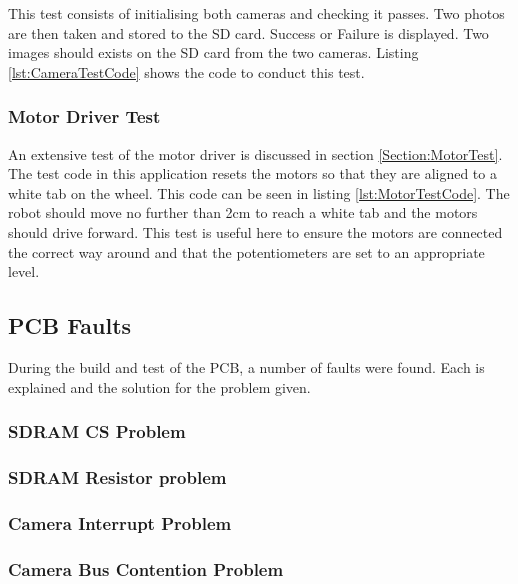 This test consists of initialising both cameras and checking it passes. Two photos are then taken and stored to the SD card. Success or Failure is displayed. Two images should exists on the SD card from the two cameras. Listing \ref{lst:CameraTestCode} shows the code to conduct this test.


\subsubsection{Motor Driver Test}
An extensive test of the motor driver is discussed in section \ref{Section:MotorTest}. The test code in this application resets the motors so that they are aligned to a white tab on the wheel. This code can be seen in listing \ref{lst:MotorTestCode}. The robot should move no further than 2cm to reach a white tab and the motors should drive forward. This test is useful here to ensure the motors are connected the correct way around and that the potentiometers are set to an appropriate level.



\subsection{PCB Faults}
During the build and test of the PCB, a number of faults were found. Each is explained and the solution for the problem given. 
\subsubsection{SDRAM CS Problem}
\subsubsection{SDRAM Resistor problem}
\subsubsection{Camera Interrupt Problem}
\subsubsection{Camera Bus Contention Problem}
